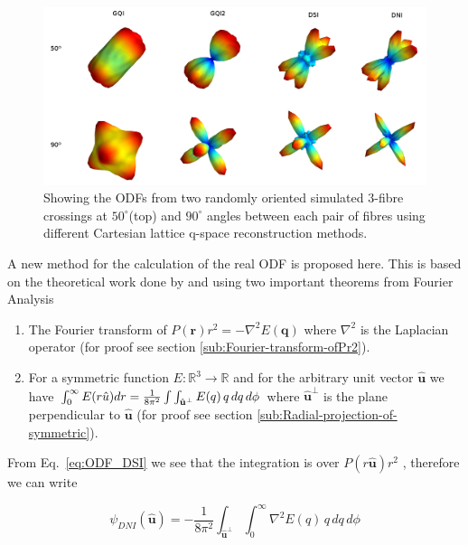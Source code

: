 \documentclass{bioinfo}
\begin{document}
%
\begin{figure}
\begin{centering}
\includegraphics[scale=0.3]{figures/triple_crossing_gqi_gqi2_dsi_dni}
\par\end{centering}

\caption{Showing the ODFs from two randomly oriented simulated $3$-fibre crossings
at $50^{\circ}$(top) and $90^{\circ}$ angles between each pair of
fibres using different Cartesian lattice q-space reconstruction methods. }


\label{Flo:beautiful-triple-crossing}
\end{figure}


A new method for the calculation of the real ODF is proposed here.
This is based on the theoretical work done by \citet{aganj2010reconstruction}
and \citet{canalesrodriguez2009} using
two important theorems from Fourier Analysis
\begin{enumerate}
\item The Fourier transform of $P(\mathbf{r})r^{2}=-\nabla^{2}E(\mathbf{q})$
where $\nabla^{2}$ is the Laplacian operator (for proof see section
\ref{sub:Fourier-transform-ofPr2}).
\item For a symmetric function $E:\mathbb{R}^{3}\rightarrow\mathbb{R}$
and for the arbitrary unit vector $\hat{\mathbf{u}}$ we have $\intop_{0}^{\infty}E(r\hat{u})dr=\frac{1}{8\pi^{2}}\int\int_{\hat{\mathbf{u}}^{\perp}}E(q)\, q\, dq\, d\phi$
where $\hat{\mathbf{u}}^{\perp}$ is the plane perpendicular to $\hat{\mathbf{u}}$
(for proof see section \ref{sub:Radial-projection-of-symmetric}).
\end{enumerate}
From Eq.~\ref{eq:ODF_DSI} we see that the integration is over $P(r\hat{\mathbf{u}})r^{2}$
, therefore we can write

%
\begin{equation}
\psi_{DNI}(\hat{\mathbf{u}})=-\frac{1}{8\pi^{2}}\int_{\hat{\mathbf{u}}^{\perp}}\int_{0}^{\infty}\nabla^{2}E(q)\, q\, dq\, d\phi\label{eq:ODF_DNI}\end{equation}
\end{document}
